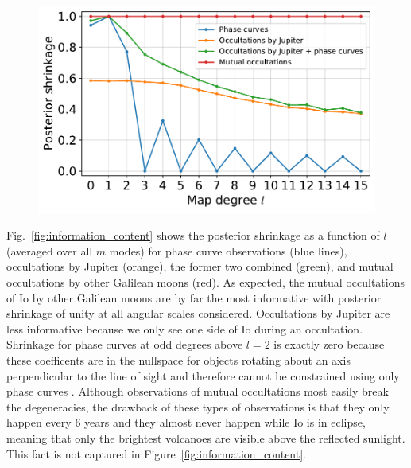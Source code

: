 \documentclass[linenumbers,modern]{aastex62}
\begin{document}
\begin{figure}[t!]
    \begin{centering}
    \includegraphics[width=\linewidth]{figures/information_content.pdf}
    \end{centering}
\end{figure}

Fig.~\ref{fig:information_content} shows the posterior shrinkage as a function of $l$ (averaged over all $m$ modes) for phase curve observations (blue lines), occultations by Jupiter (orange), the former two combined (green), and mutual occultations by other Galilean moons (red).
As expected, the mutual occultations of Io by other Galilean moons are by far the most informative with posterior shrinkage of unity at all angular scales considered. 
Occultations by Jupiter are less informative because we only see one side of Io during an occultation.
Shrinkage for phase curves at odd degrees above $l=2$ is exactly zero because these coefficents are in the nullspace for objects rotating about an axis perpendicular to the line of sight and therefore cannot be constrained using only phase curves \citep{luger2021}. 
Although observations of mutual occultations most easily break the degeneracies, the drawback of these types of observations is that they only happen every 6 years and they almost never happen while Io is in eclipse, meaning that only the brightest volcanoes are visible above the reflected sunlight.
This fact is not captured in Figure~\ref{fig:information_content}. 
\end{document}

